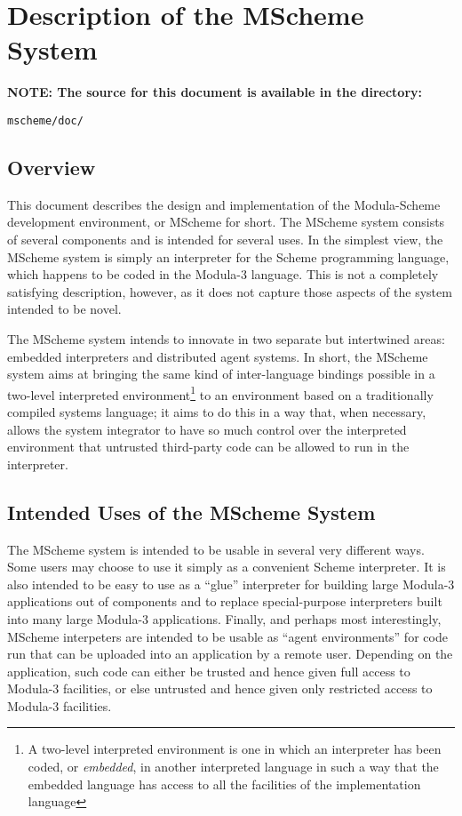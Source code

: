 
\chapter{Description of the MScheme System}

{\bf NOTE: The source for this document is available in the directory:}\par
\hskip4pc{\tt mscheme/doc/}

\bigskip

\section{Overview}

This document describes the design and implementation of the
Modula-Scheme development environment, or MScheme for short.  The
MScheme system consists of several components and is intended for
several uses.  In the simplest view, the MScheme system is simply an
interpreter for the Scheme\cite{scheme-initial-report,r4rs}
programming language, which happens to be coded in the
Modula-3\cite{spwm3} language.  This is not a completely satisfying
description, however, as it does not capture those aspects of the
system intended to be novel.

The MScheme system intends to innovate in two separate but intertwined
areas: embedded interpreters and distributed agent systems.  In short,
the MScheme system aims at bringing the same kind of inter-language
bindings possible in a two-level interpreted environment\footnote{A
  two-level interpreted environment is one in which an interpreter has
  been coded, or {\em embedded\/}, in another interpreted language in
  such a way that the embedded language has access to all the
  facilities of the implementation language } to an environment based
on a traditionally compiled systems language; it aims to do this in a
way that, when necessary, allows the system integrator to have so much
control over the interpreted environment that untrusted third-party
code can be allowed to run in the interpreter.

\section{Intended Uses of the MScheme System}

The MScheme system is intended to be usable in several very different
ways.  Some users may choose to use it simply as a convenient Scheme
interpreter.  It is also intended to be easy to use as a ``glue''
interpreter for building large Modula-3 applications out of components
and to replace special-purpose interpreters built into many large
Modula-3 applications.  Finally, and perhaps most interestingly,
MScheme interpeters are intended to be usable as ``agent
environments'' for code run that can be uploaded into an application
by a remote user.  Depending on the application, such code can either
be trusted and hence given full access to Modula-3 facilities, or else
untrusted and hence given only restricted access to Modula-3
facilities.

